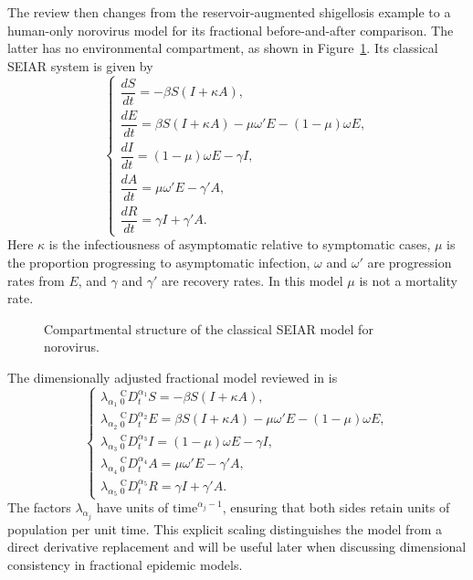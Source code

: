 \documentclass[00-main.tex]{subfiles}
\begin{document}
The review then changes from the reservoir-augmented shigellosis example to a human-only norovirus model for its fractional before-and-after comparison. The latter has no environmental compartment, as shown in Figure~\ref{fig:norovirus-seiar}. Its classical SEIAR system is given by \cite{Ch21}
\[
\begin{cases}
 \dfrac{dS}{dt}=-\beta S(I+\kappa A),\\[8pt]
 \dfrac{dE}{dt}=\beta S(I+\kappa A)-\mu\omega' E-(1-\mu)\omega E,\\[8pt]
 \dfrac{dI}{dt}=(1-\mu)\omega E-\gamma I,\\[8pt]
 \dfrac{dA}{dt}=\mu\omega' E-\gamma' A,\\[8pt]
 \dfrac{dR}{dt}=\gamma I+\gamma' A.
\end{cases}
\]
Here $\kappa$ is the infectiousness of asymptomatic relative to symptomatic cases, $\mu$ is the proportion progressing to asymptomatic infection, $\omega$ and $\omega'$ are progression rates from $E$, and $\gamma$ and $\gamma'$ are recovery rates.
In this model $\mu$ is not a mortality rate.

\begin{figure}[htbp]
\centering
{}
\caption{Compartmental structure of the classical SEIAR model for norovirus.}
\label{fig:norovirus-seiar}
\end{figure}

The dimensionally adjusted fractional model reviewed in \cite{Ch21} is
\[
\begin{cases}
 \lambda_{\alpha_1}\,{}_{0}^{\mathrm C}\!D_t^{\alpha_1}S=-\beta S(I+\kappa A),\\[3pt]
 \lambda_{\alpha_2}\,{}_{0}^{\mathrm C}\!D_t^{\alpha_2}E=\beta S(I+\kappa A)-\mu\omega' E-(1-\mu)\omega E,\\[3pt]
 \lambda_{\alpha_3}\,{}_{0}^{\mathrm C}\!D_t^{\alpha_3}I=(1-\mu)\omega E-\gamma I,\\[3pt]
 \lambda_{\alpha_4}\,{}_{0}^{\mathrm C}\!D_t^{\alpha_4}A=\mu\omega' E-\gamma' A,\\[3pt]
 \lambda_{\alpha_5}\,{}_{0}^{\mathrm C}\!D_t^{\alpha_5}R=\gamma I+\gamma' A.
\end{cases}
\]
The factors $\lambda_{\alpha_j}$ have units of $\text{time}^{\alpha_j-1}$, ensuring that both sides retain units of population per unit time.
This explicit scaling distinguishes the model from a direct derivative replacement and will be useful later when discussing dimensional consistency in fractional epidemic models.

\ifSubfilesClassLoaded{\printbibliography}{}
\end{document}
